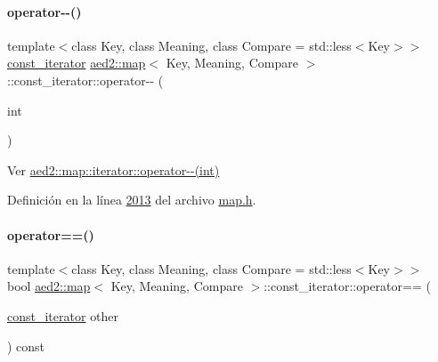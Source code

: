 \paragraph{\texorpdfstring{operator-\/-\/()}{operator--()}\hspace{0.1cm}{\footnotesize\ttfamily [2/2]}}
{\footnotesize\ttfamily template$<$class Key, class Meaning, class Compare = std\+::less$<$\+Key$>$$>$ \\
\hyperlink{classaed2_1_1map_1_1const__iterator}{const\+\_\+iterator} \hyperlink{classaed2_1_1map}{aed2\+::map}$<$ Key, Meaning, Compare $>$\+::const\+\_\+iterator\+::operator-\/-\/ (\begin{DoxyParamCaption}\item[{int}]{ }\end{DoxyParamCaption})\hspace{0.3cm}{\ttfamily [inline]}}



Ver \hyperlink{classaed2_1_1map_1_1iterator_add45e9ddbb8eeda99326cdb9ac9dd225_add45e9ddbb8eeda99326cdb9ac9dd225}{aed2\+::map\+::iterator\+::operator-\/-\/(int)} 



Definición en la línea \hyperlink{map_8h_source_l02013}{2013} del archivo \hyperlink{map_8h_source}{map.\+h}.

\mbox{\label{classaed2_1_1map_1_1const__iterator_a2ad68c35012e0c6b67d67c04d96585be_a2ad68c35012e0c6b67d67c04d96585be}} 
\paragraph{\texorpdfstring{operator==()}{operator==()}}
{\footnotesize\ttfamily template$<$class Key, class Meaning, class Compare = std\+::less$<$\+Key$>$$>$ \\
bool \hyperlink{classaed2_1_1map}{aed2\+::map}$<$ Key, Meaning, Compare $>$\+::const\+\_\+iterator\+::operator== (\begin{DoxyParamCaption}\item[{\hyperlink{classaed2_1_1map_1_1const__iterator}{const\+\_\+iterator}}]{other }\end{DoxyParamCaption}) const\hspace{0.3cm}{\ttfamily [inline]}}



